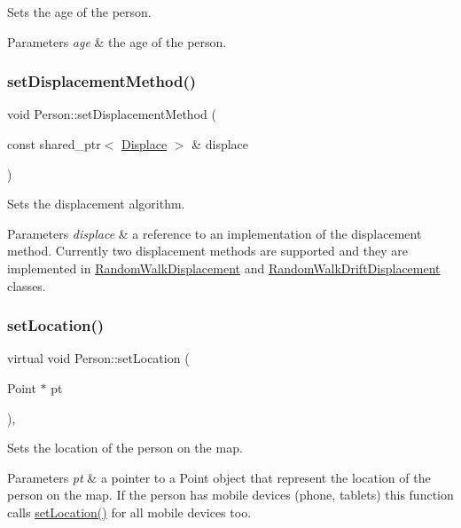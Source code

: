 Sets the age of the person. 
\begin{DoxyParams}{Parameters}
{\em age} & the age of the person. \\
\hline
\end{DoxyParams}
\mbox{\label{class_person_a89ada26d3541bc82e514dae833dc959d}} 
\subsubsection{\texorpdfstring{set\+Displacement\+Method()}{setDisplacementMethod()}}
{\footnotesize\ttfamily void Person\+::set\+Displacement\+Method (\begin{DoxyParamCaption}\item[{const shared\+\_\+ptr$<$ \hyperlink{class_displace}{Displace} $>$ \&}]{displace }\end{DoxyParamCaption})}

Sets the displacement algorithm. 
\begin{DoxyParams}{Parameters}
{\em displace} & a reference to an implementation of the displacement method. Currently two displacement methods are supported and they are implemented in \hyperlink{class_random_walk_displacement}{Random\+Walk\+Displacement} and \hyperlink{class_random_walk_drift_displacement}{Random\+Walk\+Drift\+Displacement} classes. \\
\hline
\end{DoxyParams}
\mbox{\label{class_person_a05f4ac2107d59e03f0f336eda08aa358}} 
\subsubsection{\texorpdfstring{set\+Location()}{setLocation()}}
{\footnotesize\ttfamily virtual void Person\+::set\+Location (\begin{DoxyParamCaption}\item[{Point $\ast$}]{pt }\end{DoxyParamCaption})\hspace{0.3cm}{\ttfamily [override]}, {\ttfamily [virtual]}}

Sets the location of the person on the map. 
\begin{DoxyParams}{Parameters}
{\em pt} & a pointer to a Point object that represent the location of the person on the map. If the person has mobile devices (phone, tablets) this function calls \hyperlink{class_person_a05f4ac2107d59e03f0f336eda08aa358}{set\+Location()} for all mobile devices too. \\
\hline
\end{DoxyParams}


